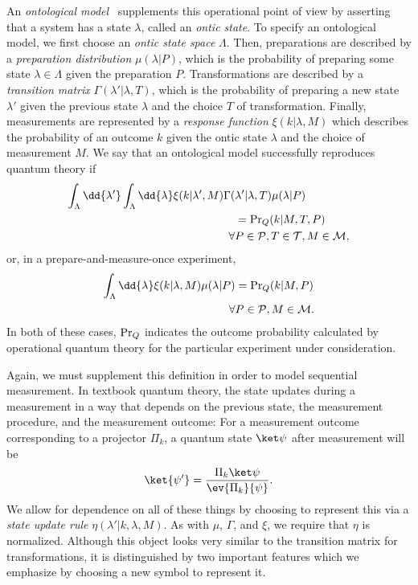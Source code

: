 \documentclass[%
 reprint,
superscriptaddress,
nofootinbib,
 amsmath,amssymb,
 prx, 
 accepted=2019-09-27,
]{quantumarticle}
\renewcommand{\Pr}{\textup{Pr}}
\begin{document}
An \emph{ontological
  model}~\cite{SpekkensContextualitypreparationstransformations2005,HarriganOntologicalmodelsinterpretation2007,RudolphOntologicalModelsQuantum2006}
supplements this operational point of view by asserting that a system
has a state $\lambda$, called an \emph{ontic state}. To specify an
ontological model, we first choose an \emph{ontic state space}
$\Lambda$. Then, preparations are described by a \emph{preparation
  distribution} $\mu(\lambda|P)$, which is the probability of
preparing some state $\lambda\in\Lambda$ given the preparation
$P$. Transformations are described by a \emph{transition matrix}
$\Gamma(\lambda'|\lambda,T)$, which is the probability of preparing a
new state $\lambda'$ given the previous state $\lambda$ and the choice
$T$ of transformation. Finally, measurements are represented by a
\emph{response function} $\xi(k|\lambda,M)$ which describes the
probability of an outcome $k$ given the ontic state $\lambda$ and the
choice of measurement $M$. We say that an ontological model
successfully reproduces quantum theory if
\begin{align}
  \label{eq:43}
  \int_\Lambda\dd{\lambda'}\int_\Lambda\dd{\lambda}\xi(k|\lambda',M)\Gamma(&\lambda'|\lambda,T)\mu(\lambda|P)\nonumber\\
  &= \Pr_Q(k|M,T,P)\\
  \forall &P\in\mathcal P, T\in\mathcal T, M\in\mathcal M,\nonumber
\end{align}
or, in a prepare-and-measure-once experiment,
\begin{align}
  \label{eq:44}
  \int_\Lambda\dd{\lambda}\xi(k|\lambda,M)\mu(\lambda|P) &= \Pr_Q(k|M,P)\\
  \forall &P\in\mathcal P, M\in\mathcal M.\nonumber
\end{align}
In both of these cases, $\Pr_Q$ indicates the outcome probability
calculated by operational quantum theory for the particular
experiment under consideration.

Again, we must supplement this definition in order to model sequential
measurement. In textbook quantum theory, the state updates during a
measurement in a way that depends on the previous state, the
measurement procedure, and the measurement outcome: For a measurement
outcome corresponding to a projector $\Pi_k$, a quantum state
$\ket\psi$ after measurement will be
\begin{equation}
  \label{eq:23}
  \ket{\psi'}= \frac{\Pi_k\ket\psi}{\ev{\Pi_k}{\psi}}.
\end{equation}
We allow for dependence on all of these things by choosing to
represent this via a \emph{state update rule}
$\eta(\lambda'|k,\lambda,M)$. As with $\mu$, $\Gamma$, and $\xi$, we
require that $\eta$ is normalized. Although this object looks very
similar to the transition matrix for transformations, it is
distinguished by two important features which we emphasize by choosing
a new symbol to represent it.
\end{document}
